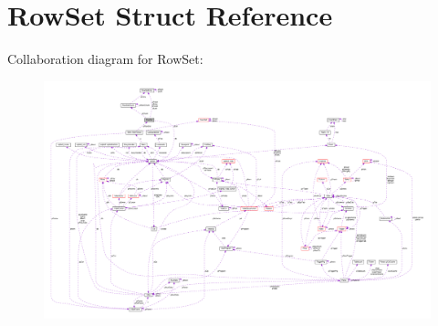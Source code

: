 \hypertarget{structRowSet}{}\section{Row\+Set Struct Reference}
\label{structRowSet}


Collaboration diagram for Row\+Set\+:\nopagebreak
\begin{figure}[H]
\begin{center}
\leavevmode
\includegraphics[width=350pt]{structRowSet__coll__graph}
\end{center}
\end{figure}
